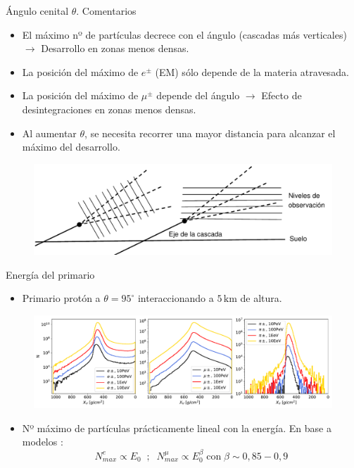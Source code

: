 \documentclass{beamer}
\begin{document}
\begin{frame}{Ángulo cenital $\theta$. Comentarios}
	\begin{itemize}
		\item El máximo nº de partículas decrece con el ángulo (cascadas más verticales) $\rightarrow$ Desarrollo en zonas menos densas.
		\item La posición del máximo de $e^\pm$ (EM) sólo depende de la materia atravesada.
		\item La posición del máximo de $\mu^\pm$ depende del ángulo $\rightarrow$ Efecto de desintegraciones en zonas menos densas.
		\item Al aumentar $\theta$, se necesita recorrer una mayor distancia para alcanzar el máximo del desarrollo.
	\end{itemize}
		\begin{figure}[H]
	\centering
	\includegraphics[width=.65\linewidth]{figures/cascadas/AIRES_planos_v2}
\end{figure}
\end{frame}
\begin{frame}{Energía del primario}
		\begin{itemize}
		\item Primario protón a $\theta = 95^\circ$ interaccionando a $5\,\mathrm{km}$ de altura.
	\end{itemize}
	\begin{figure}[H]
		\centering
		\includegraphics[width=1\linewidth]{figures/cascadas/upgoing_p_varE_95deg_5km_v3}
	\end{figure}
\begin{itemize}
	\item Nº máximo de partículas prácticamente lineal con la energía. En base a modelos \cite{matthews2005heitler}:
	\begin{equation*}
			N_{max}^{e}\propto E_0\;\;;\;\;N_{max}^{\mu}\propto E_0^\beta\;\text{con}\;\beta\sim0,85-0,9
	\end{equation*}
\end{itemize}
\end{frame}
\end{document}
